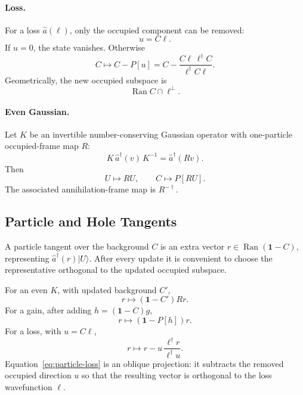\documentclass[aps,prb,onecolumn,nofootinbib,superscriptaddress]{revtex4-2}
\newcommand{\Id}{\mathbf{1}}
\newcommand{\Ran}{\operatorname{Ran}}
\newcommand{\ket}[1]{\lvert #1\rangle}
\newcommand{\ahat}{\hat a}
\begin{document}
\paragraph*{Loss.}
For a loss \(\ahat(\ell)\), only the occupied component can be removed:
\begin{equation}
  u=C\ell.
\end{equation}
If \(u=0\), the state vanishes.  Otherwise
\begin{equation}
  C\longmapsto C-P[u]
  =
  C-\frac{C\ell\,\ell^\dagger C}{\ell^\dagger C\ell}.
  \label{eq:loss-background}
\end{equation}
Geometrically, the new occupied subspace is
\begin{equation}
  \Ran C\cap \ell^\perp .
\end{equation}

\paragraph*{Even Gaussian.}
Let \(K\) be an invertible number-conserving Gaussian operator with
one-particle occupied-frame map \(R\):
\begin{equation}
  K\,\ahat^\dagger(v)\,K^{-1}=\ahat^\dagger(Rv).
  \label{eq:even-R}
\end{equation}
Then
\begin{equation}
  U\longmapsto RU,\qquad
  C\longmapsto P[RU].
  \label{eq:even-background}
\end{equation}
The associated annihilation-frame map is \(R^{-\dagger}\).

\subsection{Particle and Hole Tangents}

A particle tangent over the background \(C\) is an extra vector
\(r\in\Ran(\Id-C)\), representing
\(\ahat^\dagger(r)\ket{U}\).  After every update it is convenient to choose
the representative orthogonal to the updated occupied subspace.

For an even \(K\), with updated background \(C'\),
\begin{equation}
  r\longmapsto (\Id-C')Rr.
  \label{eq:particle-even}
\end{equation}
For a gain, after adding \(h=(\Id-C)g\),
\begin{equation}
  r\longmapsto (\Id-P[h])r.
  \label{eq:particle-gain}
\end{equation}
For a loss, with \(u=C\ell\),
\begin{equation}
  r\longmapsto r-u\,\frac{\ell^\dagger r}{\ell^\dagger u}.
  \label{eq:particle-loss}
\end{equation}
Equation~\eqref{eq:particle-loss} is an oblique projection: it subtracts the
removed occupied direction \(u\) so that the resulting vector is orthogonal
to the loss wavefunction \(\ell\).
\end{document}
